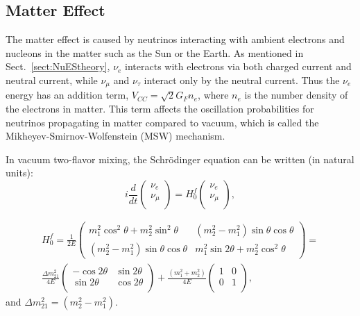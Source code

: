 \subsection{Matter Effect}\label{sect:MSW}
The matter effect is caused by neutrinos interacting with ambient electrons and nucleons in the matter such as the Sun or the Earth. As mentioned in Sect.~\ref{sect:NuEStheory}, $\nu_e$ interacts with electrons via both charged current and neutral current, while $\nu_\mu$ and $\nu_\tau$ interact only by the neutral current. Thus the $\nu_e$ energy has an addition term, $V_{CC} =\sqrt2G_Fn_e$, where $n_e$ is the number density of the electrons in matter. This term affects the oscillation probabilities for neutrinos propagating in matter compared to vacuum, which is called the Mikheyev-Smirnov-Wolfenstein (MSW) mechanism\cite{smirnov2016solar,smirnov2005msw}.

In vacuum two-flavor mixing, the Schr\"{o}dinger equation can be written (in natural units)\cite{xing2011neutrinos}:
\begin{equation}\label{eq:2flavor_simple}
	i\frac{d}{dt}\begin{pmatrix}
		\nu_e\\
		\nu_\mu\\
	\end{pmatrix}
	=
	H^f_0
	\begin{pmatrix}
		\nu_e\\
		\nu_\mu\\
	\end{pmatrix},
\end{equation}

\begin{equation} \label{eq:H0f}
\begin{aligned}
 H^f_0 = \frac{1}{2E}\begin{pmatrix}m^2_1\cos^2\theta+m^2_2\sin^2\theta & (m^2_2-m^2_1)\sin\theta\cos\theta \\ (m^2_2-m^2_1)\sin\theta\cos\theta & m^2_1\sin2\theta+m^2_2\cos^2\theta\end{pmatrix} =
\\
\frac{\Delta m_{21}^2}{4E}\begin{pmatrix}
	-\cos 2\theta & \sin 2\theta\\
	\sin 2\theta & \cos 2\theta\\
\end{pmatrix}+\frac{(m_1^2+m_2^2)}{4E}\begin{pmatrix}
	1 & 0\\
	0 &1\\
\end{pmatrix},
\end{aligned}
\end{equation}
and $\Delta m^2_{21}=(m^2_2 - m^2_1)$.

